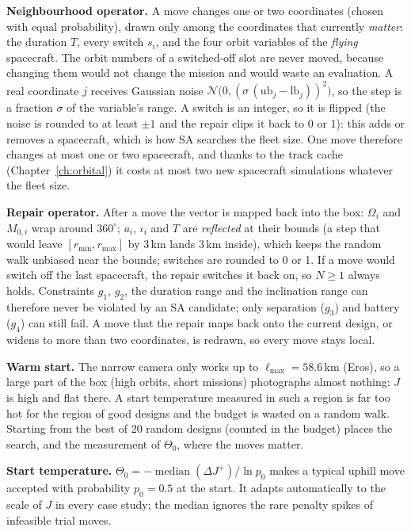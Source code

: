 \textbf{Neighbourhood operator.} A move changes one or two coordinates (chosen with equal
probability), drawn only among the coordinates that currently \emph{matter}: the duration $T$, every
switch $s_i$, and the four orbit variables of the \emph{flying} spacecraft. The orbit numbers of a
switched-off slot are never moved, because changing them would not change the mission and would
waste an evaluation. A real coordinate $j$ receives Gaussian noise
$\mathcal N\bigl(0,(\sigma\,(\mathrm{ub}_j-\mathrm{lb}_j))^2\bigr)$, so the step is a fraction $\sigma$
of the variable's range. A switch is an integer, so it is flipped (the noise is rounded to at least
$\pm1$ and the repair clips it back to 0 or 1): this adds or removes a spacecraft, which is how
\ac{SA} searches the fleet size. One move therefore changes at most one or two spacecraft, and
thanks to the track cache (Chapter~\ref{ch:orbital}) it costs at most two new spacecraft
simulations whatever the fleet size.

\textbf{Repair operator.} After a move the vector is mapped back into the box:
$\Omega_i$ and $M_{0,i}$ wrap around $360^\circ$; $a_i$, $\iota_i$ and $T$ are \emph{reflected} at
their bounds (a step that would leave $[r_{\min},r_{\max}]$ by 3\,km lands 3\,km inside), which keeps
the random walk unbiased near the bounds; switches are rounded to 0 or 1. If a move would switch
off the last spacecraft, the repair switches it back on, so $N\ge1$ always holds. Constraints
$g_1$, $g_2$, the duration range and the inclination range can therefore never be violated by an
\ac{SA} candidate; only separation ($g_3$) and battery ($g_4$) can still fail. A move that the
repair maps back onto the current design, or widens to more than two coordinates, is redrawn, so
every move stays local.

\textbf{Warm start.} The narrow camera only works up to $\ell_{\max}=58.6$\,km (Eros), so a large
part of the box (high orbits, short missions) photographs almost nothing: $J$ is high and flat
there. A start temperature measured in such a region is far too hot for the region of good designs
and the budget is wasted on a random walk. Starting from the best of 20 random designs (counted in
the budget) places the search, and the measurement of $\Theta_0$, where the moves matter.

\textbf{Start temperature.} $\Theta_0=-\operatorname{median}(\Delta J^{+})/\ln p_0$ makes a
typical uphill move accepted with probability $p_0=0.5$ at the start. It adapts automatically to the
scale of $J$ in every case study; the median ignores the rare penalty spikes of infeasible
trial moves.

